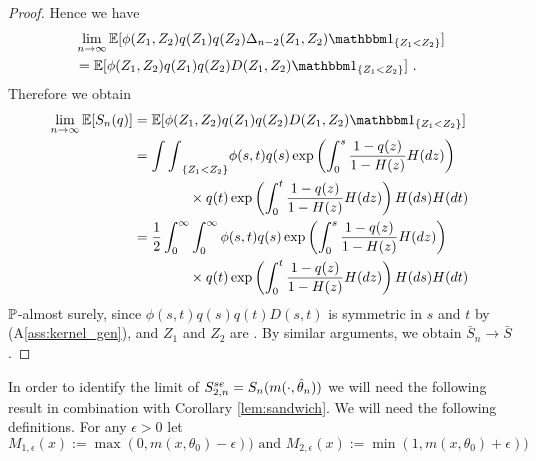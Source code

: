 \begin{lemma}
\begin{proof}
		Hence we have 
		\begin{align*}
			&\lim\limits_{n\to\infty}\E[\phi(Z_1,Z_2)q(Z_1)q(Z_2) \Delta_{n-2}(Z_1, Z_2) \I{Z_1<Z_2}] \\
			&= \E[\phi(Z_1,Z_2)q(Z_1)q(Z_2) D(Z_1, Z_2) \I{Z_1<Z_2}]\mdot
		\end{align*}
		Therefore we obtain 
		\begin{align*}
		\lim\limits_{n\to\infty}\E[S_n(q)]&= \E[\phi(Z_1,Z_2)q(Z_1)q(Z_2) D(Z_1, Z_2) \I{Z_1<Z_2}]\\
		&= {\int\int}_{\{Z_1<Z_2\}} \phi(s,t)q(s)\exp\left(\int_{0}^{s} \frac{1-q(z)}{1-H(z)} H(dz)\right) \\
		&\qquad\qquad \times q(t) \exp\left(\int_{0}^{t} \frac{1-q(z)}{1-H(z)} H(dz)\right) H(ds)H(dt)\\
		&= \frac{1}{2}\int_{0}^{\infty}\int_{0}^{\infty}\phi(s,t)q(s) \exp\left(\int_{0}^{s} \frac{1-q(z)}{1-H(z)} H(dz)\right)\\
		&\qquad\qquad \times q(t)\exp\left(\int_{0}^{t} \frac{1-q(z)}{1-H(z)} H(dz)\right) H(ds)H(dt)
		\end{align*}
		$\P$-almost surely, since $\phi(s,t)q(s)q(t)D(s,t)$ is symmetric in $s$ and $t$ by (A\ref{ass:kernel_gen}), and $Z_1$ and $Z_2$ are \iid. By similar arguments, we obtain $\bar{S}_n \to \bar{S}$ \wpo. 
		
	\end{proof}
\end{lemma}
%
%
In order to identify the limit of $\snse{2}{n} = S_n(m(\cdot, \hat\theta_n))$ we will need the following result in combination with Corollary \ref{lem:sandwich}. We will need the following definitions. For any $\epsilon >0$ let
$$M_{1,\epsilon}(x) := \max(0, m(x, \theta_0) - \epsilon)) \textrm{ and } M_{2,\epsilon}(x) := \min(1, m(x, \theta_0) + \epsilon))$$
